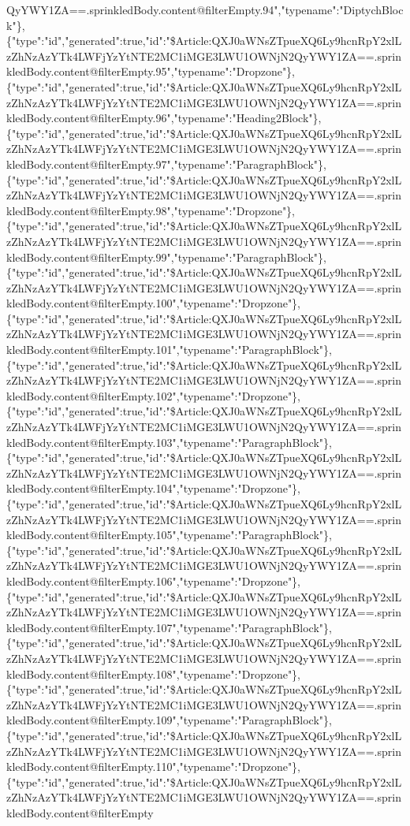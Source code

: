 QyYWY1ZA==.sprinkledBody.content@filterEmpty.94","typename":"DiptychBlock"\},\{"type":"id","generated":true,"id":"\$Article:QXJ0aWNsZTpueXQ6Ly9hcnRpY2xlLzZhNzAzYTk4LWFjYzYtNTE2MC1iMGE3LWU1OWNjN2QyYWY1ZA==.sprinkledBody.content@filterEmpty.95","typename":"Dropzone"\},\{"type":"id","generated":true,"id":"\$Article:QXJ0aWNsZTpueXQ6Ly9hcnRpY2xlLzZhNzAzYTk4LWFjYzYtNTE2MC1iMGE3LWU1OWNjN2QyYWY1ZA==.sprinkledBody.content@filterEmpty.96","typename":"Heading2Block"\},\{"type":"id","generated":true,"id":"\$Article:QXJ0aWNsZTpueXQ6Ly9hcnRpY2xlLzZhNzAzYTk4LWFjYzYtNTE2MC1iMGE3LWU1OWNjN2QyYWY1ZA==.sprinkledBody.content@filterEmpty.97","typename":"ParagraphBlock"\},\{"type":"id","generated":true,"id":"\$Article:QXJ0aWNsZTpueXQ6Ly9hcnRpY2xlLzZhNzAzYTk4LWFjYzYtNTE2MC1iMGE3LWU1OWNjN2QyYWY1ZA==.sprinkledBody.content@filterEmpty.98","typename":"Dropzone"\},\{"type":"id","generated":true,"id":"\$Article:QXJ0aWNsZTpueXQ6Ly9hcnRpY2xlLzZhNzAzYTk4LWFjYzYtNTE2MC1iMGE3LWU1OWNjN2QyYWY1ZA==.sprinkledBody.content@filterEmpty.99","typename":"ParagraphBlock"\},\{"type":"id","generated":true,"id":"\$Article:QXJ0aWNsZTpueXQ6Ly9hcnRpY2xlLzZhNzAzYTk4LWFjYzYtNTE2MC1iMGE3LWU1OWNjN2QyYWY1ZA==.sprinkledBody.content@filterEmpty.100","typename":"Dropzone"\},\{"type":"id","generated":true,"id":"\$Article:QXJ0aWNsZTpueXQ6Ly9hcnRpY2xlLzZhNzAzYTk4LWFjYzYtNTE2MC1iMGE3LWU1OWNjN2QyYWY1ZA==.sprinkledBody.content@filterEmpty.101","typename":"ParagraphBlock"\},\{"type":"id","generated":true,"id":"\$Article:QXJ0aWNsZTpueXQ6Ly9hcnRpY2xlLzZhNzAzYTk4LWFjYzYtNTE2MC1iMGE3LWU1OWNjN2QyYWY1ZA==.sprinkledBody.content@filterEmpty.102","typename":"Dropzone"\},\{"type":"id","generated":true,"id":"\$Article:QXJ0aWNsZTpueXQ6Ly9hcnRpY2xlLzZhNzAzYTk4LWFjYzYtNTE2MC1iMGE3LWU1OWNjN2QyYWY1ZA==.sprinkledBody.content@filterEmpty.103","typename":"ParagraphBlock"\},\{"type":"id","generated":true,"id":"\$Article:QXJ0aWNsZTpueXQ6Ly9hcnRpY2xlLzZhNzAzYTk4LWFjYzYtNTE2MC1iMGE3LWU1OWNjN2QyYWY1ZA==.sprinkledBody.content@filterEmpty.104","typename":"Dropzone"\},\{"type":"id","generated":true,"id":"\$Article:QXJ0aWNsZTpueXQ6Ly9hcnRpY2xlLzZhNzAzYTk4LWFjYzYtNTE2MC1iMGE3LWU1OWNjN2QyYWY1ZA==.sprinkledBody.content@filterEmpty.105","typename":"ParagraphBlock"\},\{"type":"id","generated":true,"id":"\$Article:QXJ0aWNsZTpueXQ6Ly9hcnRpY2xlLzZhNzAzYTk4LWFjYzYtNTE2MC1iMGE3LWU1OWNjN2QyYWY1ZA==.sprinkledBody.content@filterEmpty.106","typename":"Dropzone"\},\{"type":"id","generated":true,"id":"\$Article:QXJ0aWNsZTpueXQ6Ly9hcnRpY2xlLzZhNzAzYTk4LWFjYzYtNTE2MC1iMGE3LWU1OWNjN2QyYWY1ZA==.sprinkledBody.content@filterEmpty.107","typename":"ParagraphBlock"\},\{"type":"id","generated":true,"id":"\$Article:QXJ0aWNsZTpueXQ6Ly9hcnRpY2xlLzZhNzAzYTk4LWFjYzYtNTE2MC1iMGE3LWU1OWNjN2QyYWY1ZA==.sprinkledBody.content@filterEmpty.108","typename":"Dropzone"\},\{"type":"id","generated":true,"id":"\$Article:QXJ0aWNsZTpueXQ6Ly9hcnRpY2xlLzZhNzAzYTk4LWFjYzYtNTE2MC1iMGE3LWU1OWNjN2QyYWY1ZA==.sprinkledBody.content@filterEmpty.109","typename":"ParagraphBlock"\},\{"type":"id","generated":true,"id":"\$Article:QXJ0aWNsZTpueXQ6Ly9hcnRpY2xlLzZhNzAzYTk4LWFjYzYtNTE2MC1iMGE3LWU1OWNjN2QyYWY1ZA==.sprinkledBody.content@filterEmpty.110","typename":"Dropzone"\},\{"type":"id","generated":true,"id":"\$Article:QXJ0aWNsZTpueXQ6Ly9hcnRpY2xlLzZhNzAzYTk4LWFjYzYtNTE2MC1iMGE3LWU1OWNjN2QyYWY1ZA==.sprinkledBody.content@filterEmpty